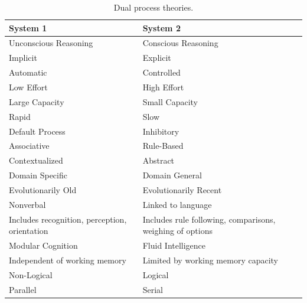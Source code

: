 \begin{table}[ht]
\begin{tabular}{|p{4cm}|p{7cm}|}  %
\hline
System 1	& System 2\tabularnewline
\hline
\hline
Unconscious Reasoning	& Conscious Reasoning\tabularnewline
\hline
Implicit	& Explicit\tabularnewline
\hline
Automatic	& Controlled\tabularnewline
\hline
Low Effort	& High Effort\tabularnewline
\hline
Large Capacity	& Small Capacity\tabularnewline
\hline
Rapid	& Slow\tabularnewline
\hline
Default Process	& Inhibitory\tabularnewline
\hline
Associative	& Rule-Based\tabularnewline
\hline
Contextualized	& Abstract\tabularnewline
\hline
Domain Specific	& Domain General\tabularnewline
\hline
Evolutionarily Old	& Evolutionarily Recent\tabularnewline
\hline
Nonverbal	& Linked to language\tabularnewline
\hline
Includes recognition, perception, orientation	& Includes rule following, comparisons, weighing of options\tabularnewline
\hline
Modular Cognition	& Fluid Intelligence\tabularnewline
\hline
Independent of working memory	& Limited by working memory capacity\tabularnewline
\hline
Non-Logical	& Logical\tabularnewline
\hline
Parallel	& Serial\tabularnewline
\hline
\end{tabular}

\caption{Dual process theories.}

\end{table}\label{table:twosys}

